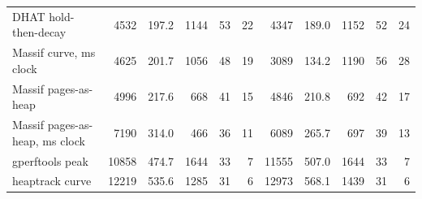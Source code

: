 \begin{tabular}{lrrrrrrrrrr}
DHAT hold-then-decay & 4532 & 197.2 & 1144 & 53 & 22 & 4347 & 189.0 & 1152 & 52 & 24 \\
Massif curve, ms clock & 4625 & 201.7 & 1056 & 48 & 19 & 3089 & 134.2 & 1190 & 56 & 28 \\
Massif pages-as-heap & 4996 & 217.6 & 668 & 41 & 15 & 4846 & 210.8 & 692 & 42 & 17 \\
Massif pages-as-heap, ms clock & 7190 & 314.0 & 466 & 36 & 11 & 6089 & 265.7 & 697 & 39 & 13 \\
gperftools peak & 10858 & 474.7 & 1644 & 33 & 7 & 11555 & 507.0 & 1644 & 33 & 7 \\
heaptrack curve & 12219 & 535.6 & 1285 & 31 & 6 & 12973 & 568.1 & 1439 & 31 & 6 \\
\bottomrule
\end{tabular}
